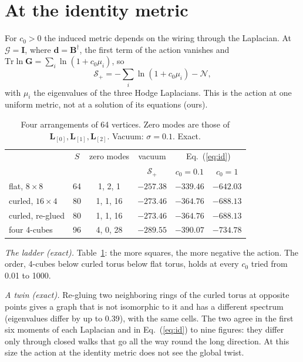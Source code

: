\documentclass[pre,twocolumn,superscriptaddress,nofootinbib]{revtex4-2}
\begin{document}
\section{At the identity metric}

For $c_0>0$ the induced metric depends on the wiring through the Laplacian. At $\boldsymbol{\mathcal{G}}=\mathbf{I}$,
where $\mathbf{d}=\mathbf{B}^{\dagger}$, the first term of the action vanishes and
$\mathrm{Tr}\ln\mathbf{G}=\sum_i\ln(1+c_0\mu_i)$, so
\begin{equation}
\mathcal{S}_{+}=-\sum_i\ln(1+c_0\mu_i)-\mathcal{N},
\label{eq:id}
\end{equation}
with $\mu_i$ the eigenvalues of the three Hodge Laplacians. This is the action at one uniform metric, not at a
solution of its equations (ours).

\begin{table}[t]
\caption{Four arrangements of 64 vertices. Zero modes are those of
$\mathbf{L}_{[0]},\mathbf{L}_{[1]},\mathbf{L}_{[2]}$. Vacuum: $\sigma=0.1$. Exact.}
\label{tab:ladder}
\begin{ruledtabular}
\begin{tabular}{lccccc}
 & $S$ & zero modes & vacuum & \multicolumn{2}{c}{Eq.~(\ref{eq:id})} \\
 & & & $\mathcal{S}_+$ & $c_0=0.1$ & $c_0=1$ \\
\hline
flat, $8\times8$ & 64 & 1, 2, 1 & $-257.38$ & $-339.46$ & $-642.03$ \\
curled, $16\times4$ & 80 & 1, 1, 16 & $-273.46$ & $-364.76$ & $-688.13$ \\
curled, re-glued & 80 & 1, 1, 16 & $-273.46$ & $-364.76$ & $-688.13$ \\
four 4-cubes & 96 & 4, 0, 28 & $-289.55$ & $-390.07$ & $-734.78$ \\
\end{tabular}
\end{ruledtabular}
\end{table}

\emph{The ladder (exact).} Table~\ref{tab:ladder}: the more squares, the more negative the action. The order,
4-cubes below curled torus below flat torus, holds at every $c_0$ tried from 0.01 to 1000.

\emph{A twin (exact).} Re-gluing two neighboring rings of the curled torus at opposite points gives a graph that is
not isomorphic to it and has a different spectrum (eigenvalues differ by up to 0.39), with the same cells. The two
agree in the first six moments of each Laplacian and in Eq.~(\ref{eq:id}) to nine figures: they differ only through
closed walks that go all the way round the long direction. At this size the action at the identity metric does not
see the global twist.
\end{document}
